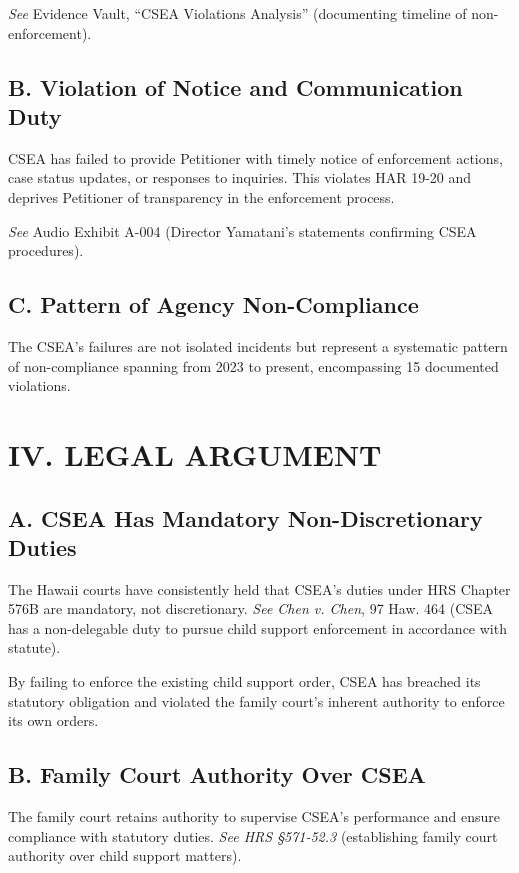 \documentclass[12pt]{article}
\begin{document}
\textit{See} Evidence Vault, ``CSEA Violations Analysis'' (documenting timeline of non-enforcement).

\subsection*{B. Violation of Notice and Communication Duty}

CSEA has failed to provide Petitioner with timely notice of enforcement actions, case status updates, or responses to inquiries. This violates HAR 19-20 and deprives Petitioner of transparency in the enforcement process.

\textit{See} Audio Exhibit A-004 (Director Yamatani's statements confirming CSEA procedures).

\subsection*{C. Pattern of Agency Non-Compliance}

The CSEA's failures are not isolated incidents but represent a systematic pattern of non-compliance spanning from 2023 to present, encompassing 15 documented violations.

\section*{IV. LEGAL ARGUMENT}

\subsection*{A. CSEA Has Mandatory Non-Discretionary Duties}

The Hawaii courts have consistently held that CSEA's duties under HRS Chapter 576B are mandatory, not discretionary. \textit{See Chen v. Chen}, 97 Haw. 464 (CSEA has a non-delegable duty to pursue child support enforcement in accordance with statute).

By failing to enforce the existing child support order, CSEA has breached its statutory obligation and violated the family court's inherent authority to enforce its own orders.

\subsection*{B. Family Court Authority Over CSEA}

The family court retains authority to supervise CSEA's performance and ensure compliance with statutory duties. \textit{See HRS \S 571-52.3} (establishing family court authority over child support matters).
\end{document}
